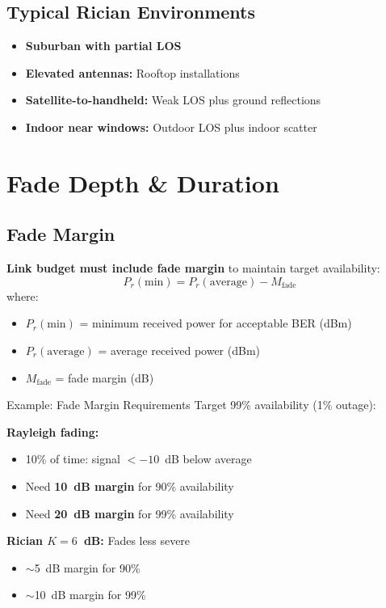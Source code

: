 \subsection{Typical Rician Environments}

\begin{itemize}
\item \textbf{Suburban with partial LOS}
\item \textbf{Elevated antennas:} Rooftop installations
\item \textbf{Satellite-to-handheld:} Weak LOS plus ground reflections
\item \textbf{Indoor near windows:} Outdoor LOS plus indoor scatter
\end{itemize}

\section{Fade Depth \& Duration}

\subsection{Fade Margin}

\textbf{Link budget must include fade margin} to maintain target availability:
\begin{equation}
P_r(\text{min}) = P_r(\text{average}) - M_{\text{fade}}
\label{eq:fade-margin}
\end{equation}
where:
\begin{itemize}
\item $P_r(\text{min})$ = minimum received power for acceptable BER (dBm)
\item $P_r(\text{average})$ = average received power (dBm)
\item $M_{\text{fade}}$ = fade margin (dB)
\end{itemize}

\begin{calloutbox}{Example: Fade Margin Requirements}
Target 99\% availability (1\% outage):

\textbf{Rayleigh fading:}
\begin{itemize}
\item 10\% of time: signal $< -10$~dB below average
\item Need \textbf{10~dB margin} for 90\% availability
\item Need \textbf{20~dB margin} for 99\% availability
\end{itemize}

\textbf{Rician $K=6$~dB:} Fades less severe
\begin{itemize}
\item $\sim$5~dB margin for 90\%
\item $\sim$10~dB margin for 99\%
\end{itemize}
\end{calloutbox}

